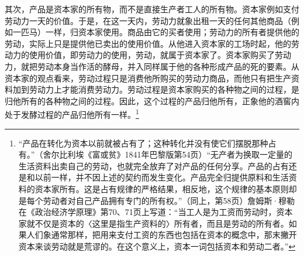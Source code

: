 \documentclass{ctexbook}
\begin{document}
    其次，产品是资本家的所有物，而不是直接生产者工人的所有物。资本家例如支付劳动力一天的价值。于是，在这一天内，劳动力就象出租一天的任何其他商品（例如一匹马）一样，归资本家使用。商品由它的买者使用；劳动力的所有者提供他的劳动，实际上只是提供他已卖出的使用价值。从他进入资本家的工场时起，他的劳动力的使用价值，即劳动力的使用，劳动，就属于资本家了。资本家购买了劳动力，就把劳动本身当作活的酵母，并入同样属于他的各种形成产品的死的要素。从资本家的观点看来，劳动过程只是消费他所购买的劳动力商品，而他只有把生产资料加到劳动力上才能消费劳动力。劳动过程是资本家购买的各种物之间的过程，是归他所有的各种物之间的过程。因此，这个过程的产品归他所有，正象他的酒窖内处于发酵过程的产品归他所有一样。\footnote{“产品在转化为资本以前就被占有了；这种转化并没有使它们摆脱那种占有。”（舍尔比利埃《富或贫》1841年巴黎版第54页）“无产者为换取一定量的生活资料出卖自己的劳动，也就完全放弃了对产品的任何分享。产品的占有还是和以前一样，并不因上述的契约而发生变化。产品完全归提供原料和生活资料的资本家所有。这是占有规律的严格结果，相反地，这个规律的基本原则却是每个劳动者对自己产品拥有专门的所有权。”（同上，第58页）詹姆斯·穆勒在《政治经济学原理》第70、71页上写道：“当工人是为工资而劳动时，资本家就不仅是资本的〈这里是指生产资料的〉所有者，而且是劳动的所有者。如果人们象通常那样，把用来支付工资的东西也包括在资本的概念中，那末撇开资本来谈劳动就是荒谬的。在这个意义上，资本一词包括资本和劳动二者。”}
\end{document}
